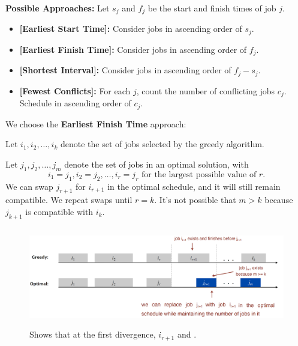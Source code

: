 \textbf{Possible Approaches:} Let $s_j$ and $f_j$ be the start and finish times of job $j$.
\begin{itemize}
    \item \textbf{[Earliest Start Time]:} Consider jobs in ascending order of $s_j$.
    \item \textbf{[Earliest Finish Time]:} Consider jobs in ascending order of $f_j$.
    \item \textbf{[Shortest Interval]:} Consider jobs in ascending order of $f_j - s_j$.
    \item \textbf{[Fewest Conflicts]:} For each $j$, count the number of conflicting jobs $c_j$. Schedule in ascending order of $c_j$.
\end{itemize}

\noindent
We choose the \textbf{Earliest Finish Time} approach:
\begin{Proof}
    Let $i_1, i_2, \dots, i_k$ denote the set of jobs selected by the greedy algorithm.
    
    Let $j_1, j_2, \dots, j_m$ denote the set of jobs in an optimal solution, with
    \[
    i_1 = j_1, i_2 = j_2, \dots, i_r = j_r \text{ for the largest possible value of } r.
    \]
    \noindent
    We can swap $j_{r+1}$ for $i_{r+1}$ in the optimal schedule, and it will still remain compatible. We repeat swaps until $r = k$.
    It’s not possible that $m > k$ because $j_{k+1}$ is compatible with $i_k$.
    \end{Proof}
   \begin{figure}[h]
    \begin{center}
      \includegraphics[height=1.7in]{./Sections/sched/interval/interval_proof.png}
    \end{center}
     \caption{Shows that at the first divergence, $i_{r+1}$ and .}\label{fig:interval_proof}
\end{figure}

\newpage 

